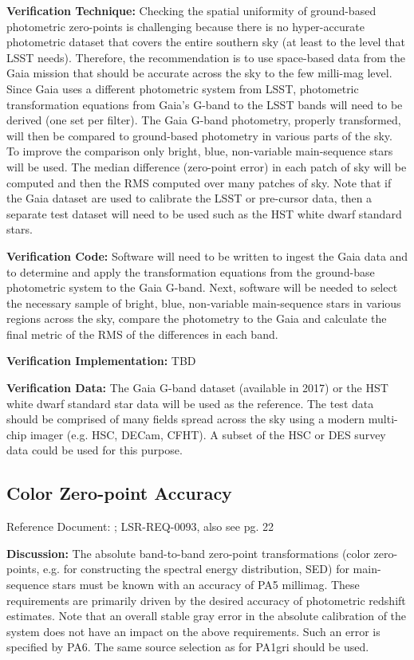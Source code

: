 \documentclass[DM,lsstdraft,toc]{lsstdoc}
\begin{document}
\textbf{Verification Technique:} Checking the spatial uniformity of
ground-based photometric zero-points is challenging because there is no
hyper-accurate photometric dataset that covers the entire southern sky
(at least to the level that LSST needs). Therefore, the recommendation
is to use space-based data from the Gaia mission that should be accurate
across the sky to the few milli-mag level. Since Gaia uses a different
photometric system from LSST, photometric transformation equations from
Gaia's G-band to the LSST bands will need to be derived (one set per
filter). The Gaia G-band photometry, properly transformed, will then be
compared to ground-based photometry in various parts of the sky. To
improve the comparison only bright, blue, non-variable main-sequence
stars will be used. The median difference (zero-point error) in each
patch of sky will be computed and then the RMS computed over many
patches of sky. Note that if the Gaia dataset are used to calibrate the
LSST or pre-cursor data, then a separate test dataset will need to be
used such as the HST white dwarf standard stars.

\textbf{Verification Code:} Software will need to be written to ingest
the Gaia data and to determine and apply the transformation equations
from the ground-base photometric system to the Gaia G-band. Next,
software will be needed to select the necessary sample of bright, blue,
non-variable main-sequence stars in various regions across the sky,
compare the photometry to the Gaia and calculate the final metric of the
RMS of the differences in each band.

\textbf{Verification Implementation:} TBD

\textbf{Verification Data:} The Gaia G-band dataset (available in 2017)
or the HST white dwarf standard star data will be used as the reference.
The test data should be comprised of many fields spread across the sky
using a modern multi-chip imager (e.g. HSC, DECam, CFHT). A subset of
the HSC or DES survey data could be used for this purpose.

\subsection{Color Zero-point Accuracy}\label{color-zero-point-accuracy}

Reference Document: ; LSR-REQ-0093, also see \SRD pg. 22

\textbf{Discussion:} The absolute band-to-band zero-point
transformations (color zero-points, e.g. for constructing the spectral
energy distribution, SED) for main-sequence stars must be known with an
accuracy of PA5 millimag. These requirements are primarily driven by the
desired accuracy of photometric redshift estimates. Note that an overall
stable gray error in the absolute calibration of the system does not
have an impact on the above requirements. Such an error is specified by
PA6. The same source selection as for PA1gri should be used.
\end{document}
